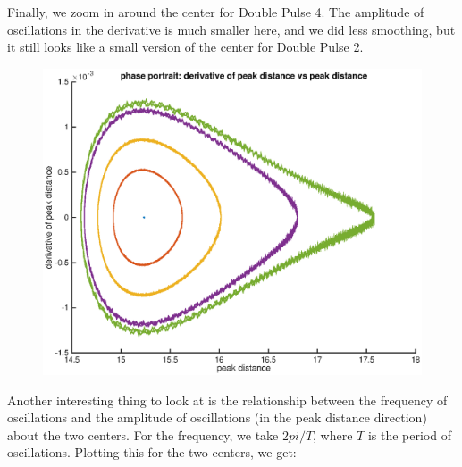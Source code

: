 \documentclass[12pt]{article}
\begin{document}
\pagebreak

Finally, we zoom in around the center for Double Pulse 4. The amplitude of oscillations in the derivative is much smaller here, and we did less smoothing, but it still looks like a small version of the center for Double Pulse 2.

\begin{figure}[H]
	\includegraphics[width=17cm]{phase4.eps}
\end{figure}

Another interesting thing to look at is the relationship between the frequency of oscillations and the amplitude of oscillations (in the peak distance direction) about the two centers. For the frequency, we take $2 pi / T$, where $T$ is the period of oscillations. Plotting this for the two centers, we get:
\end{document}
